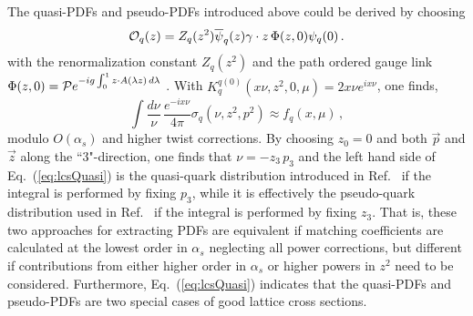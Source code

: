 The quasi-PDFs and pseudo-PDFs introduced above could be derived by choosing 
\begin{equation}
{\cal O}_{q}(z)=Z_q(z^2)\overline{\psi}_q(z)\gamma\cdot {z}\, \Phi(z,0){\psi}_q(0)\,.
\end{equation}
 with the renormalization constant $Z_q(z^2)$ and the path ordered gauge link $\Phi(z,0)={\cal P}e^{-ig\int_0^{1} z\cdot A(\lambda z)\,d\lambda}$ \cite{Ma:2017pxb}.  With $K^{q(0)}_{q}(x \nu,z^2,0,\mu)= 2 x \nu  e^{i x \nu}$, one finds,
\begin{equation}\label{eq:lcsQuasi}
\int \frac{d \nu}{\nu}\, \frac{e^{-i x \nu}}{4\pi} \sigma_{q}(\nu,z^2,p^2)\approx f_{q}(x,\mu)\, ,
\end{equation}
modulo $O(\alpha_s)$ and higher twist corrections.  By choosing $z_0=0$ and both $\vec{p}$ and $\vec{z}$ along the ``3"-direction, one finds that $\nu=-z_3\, p_3$ and the left hand side of Eq.~(\ref{eq:lcsQuasi}) is the quasi-quark distribution introduced in Ref.~\cite{Ji:2013dva} if the integral is performed by fixing $p_3$, while it is effectively the pseudo-quark distribution used in Ref.~\cite{Orginos:2017kos} if the integral is performed by fixing $z_3$. That is, these two approaches for extracting PDFs are equivalent if matching coefficients are calculated at the lowest order in $\alpha_s$ neglecting all power corrections, but different if contributions from either higher order in $\alpha_s$ or higher powers in $z^2$ need to be considered.
Furthermore, Eq.~(\ref{eq:lcsQuasi}) indicates that the quasi-PDFs and pseudo-PDFs are two special cases of good lattice cross sections. 

